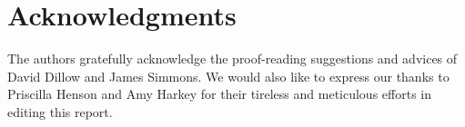 \section*{Acknowledgments}

The authors gratefully acknowledge the proof-reading suggestions and advices of
David Dillow and James Simmons. We would also like to express our thanks to
Priscilla Henson and Amy Harkey for their tireless and meticulous efforts in
editing this report.
